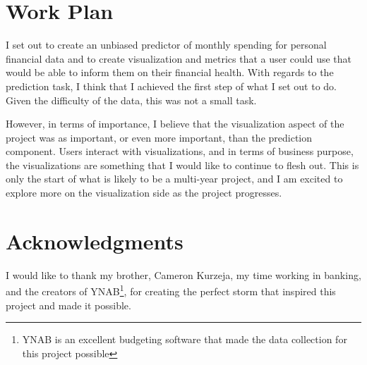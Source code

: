 \documentclass[11pt,a4paper]{article}
\begin{document}
\section{Work Plan}

I set out to create an unbiased predictor of monthly spending for personal financial data and to create visualization and metrics that a user could use that would be able to inform them on their financial health. With regards to the prediction task, I think that I achieved the first step of what I set out to do. Given the difficulty of the data, this was not a small task. 

However, in terms of importance, I believe that the visualization aspect of the project was as important, or even more important, than the prediction component. Users interact with visualizations, and in terms of business purpose, the visualizations are something that I would like to continue to flesh out. This is only the start of what is likely to be a multi-year project, and I am excited to explore more on the visualization side as the project progresses. 

\section*{Acknowledgments}

I would like to thank my brother, Cameron Kurzeja, my time working in banking, and the creators of YNAB\footnote{YNAB is an excellent budgeting software that made the data collection for this project possible}, for creating the perfect storm that inspired this project and made it possible. 




\end{document}
